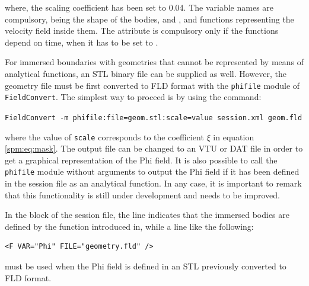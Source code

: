 where, the scaling coefficient has been set to 0.04. The variable names are compulsory, being  the shape of the bodies, and ,  and  functions representing the velocity field inside them. The attribute  is compulsory only if the functions depend on time, when it has to be set to .

For immersed boundaries with geometries that cannot be represented by means of analytical functions, an STL binary file can be supplied as well. However, the geometry file must be first converted to FLD format with the \texttt{phifile} module of \texttt{FieldConvert}. The simplest way to proceed is by using the command:

\texttt{FieldConvert -m phifile:file=geom.stl:scale=value session.xml geom.fld}

where the value of \texttt{scale} corresponds to the coefficient $\xi$ in equation \eqref{spm:eq:mask}. The output file can be changed to an VTU or DAT file in order to get a graphical representation of the Phi field. It is also possible to call the \texttt{phifile} module without arguments to output the Phi field if it has been defined in the session file as an analytical function. In any case, it is important to remark that this functionality is still under development and needs to be improved.

In the  block of the session file, the line  indicates that the immersed bodies are defined by the function introduced in, while a line like the following:

\begin{lstlisting}[style=XMLStyle]
    <F VAR="Phi" FILE="geometry.fld" />
\end{lstlisting}

must be used when the Phi field is defined in an STL previously converted to FLD format.
